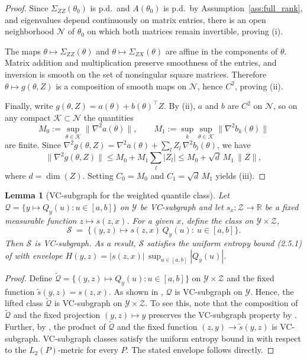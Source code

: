 \documentclass[12pt]{article}
\newtheorem{lemma}{Lemma}
\begin{document}
\begin{proof}
Since $\Sigma_{ZZ}(\theta_0)$ is p.d.\ and $A(\theta_0)$ is p.d.\ by Assumption~\ref{ass:full_rank}, and eigenvalues depend continuously on matrix entries, there is an open neighborhood $\mathcal N$ of $\theta_0$ on which both matrices remain invertible, proving (i). 

The maps $\theta\mapsto \Sigma_{ZZ}(\theta)$ and $\theta\mapsto \Sigma_{ZX}(\theta)$ are affine in the components of $\theta$. Matrix addition and multiplication preserve smoothness of the entries, and inversion is smooth on the set of nonsingular square matrices. Therefore $\theta\mapsto g(\theta,Z)$ is a composition of smooth maps on $\mathcal N$, hence $C^2$, proving (ii).

Finally, write $g(\theta,Z)=a(\theta)+b(\theta)^{\!\top}Z$. By (ii), $a$ and $b$ are $C^2$ on $\mathcal N$, so on any compact $\mathcal K\subset\mathcal N$ the quantities
\[
M_0:=\sup_{\theta\in\mathcal K}\big\|\nabla^2 a(\theta)\big\|,
\qquad
M_1:=\sup_{k}\sup_{\theta\in\mathcal K}\big\|\nabla^2 b_k(\theta)\big\|
\]
are finite. Since $\nabla^2 g(\theta,Z)=\nabla^2 a(\theta)+\sum_l Z_l\,\nabla^2 b_l(\theta)$, we have
\[
\big\|\nabla^2 g(\theta,Z)\big\|
\le M_0+M_1\sum_l |Z_l|
\le M_0+\sqrt{d}\,M_1\,\|Z\|,
\]
where $d=\dim(Z)$. Setting $C_0=M_0$ and $C_1=\sqrt{d}\,M_1$ yields (iii).
\end{proof}

\begin{lemma}[VC-subgraph for the weighted quantile class]\label{lem:VCproduct}
Let $\mathcal{Q}=\{y\mapsto Q_y(u): u\in[a,b]\}$ on $\mathcal{Y}$ be VC-subgraph and let $s_x:\mathcal{Z}\to\mathbb{R}$ be a fixed measurable function $z\mapsto s(z,x)$. For a given $x$, define the class on $\mathcal{Y}\times\mathcal{Z}$,
\[
\mathcal{S}\;=\;\big\{(y,z)\mapsto s(z,x)\,Q_y(u):\ u\in[a,b]\big\}.
\]
Then $\mathcal{S}$ is VC-subgraph. As a result, $\mathcal{S}$ satisfies the uniform entropy bound (2.5.1) of \citet{vaart1996weak} with envelope
$H(y,z)=|s(z,x)|\,\sup_{u\in[a,b]}|Q_y(u)|$.
\end{lemma}



\begin{proof}
Define $\widetilde{\mathcal{Q}}=\{(y,z)\mapsto Q_y(u): u\in[a,b]\}$ on $\mathcal{Y}\times\mathcal{Z}$ and the fixed function $\tilde s(y,z)=s(z,x)$. As shown in \citet[Lemma A-3]{van2025regression}, $\mathcal{Q}$ is VC-subgraph on $\mathcal{Y}$. Hence, the lifted class $\widetilde{\mathcal{Q}}$ is VC-subgraph on $\mathcal{Y}\times\mathcal{Z}$. To see this, note that the composition of $\widetilde{\mathcal{Q}}$ and the fixed projection $(y,z)\mapsto y$ preserves the VC-subgraph property by \citet[Lemma~2.6.18(vii)]{vaart1996weak}. Further, by \citet[Lemma~2.6.18(vi)]{vaart1996weak}, the product of $\widetilde{\mathcal{Q}}$ and the fixed function $(z,y) \to \tilde{s}(y, z)$ is VC-subgraph. VC-subgraph classes satisfy the uniform entropy bound in \citet[Eq. 2.6.7]{vaart1996weak}  with respect to the $L_2(P)$-metric for every $P$. The stated envelope follows directly.
\end{proof}
\end{document}
